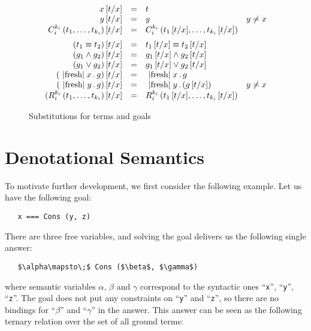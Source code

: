 \begin{figure}[t]
\[
\begin{array}{rcll}
  x\,[t/x] &=& t &\\
  y\,[t/x] &=& y & y\ne x\\
  C_i^{k_i}\,(t_1,\dots,t_{k_i})\,[t/x]&=&C_i^{k_i}\,(t_1\,[t/x],\dots,t_{k_i}\,[t/x])&\\[2mm]
  (t_1 \equiv t_2)\,[t/x]&=&t_1\,[t/x] \equiv t_2\,[t/x]&\\
  (g_1 \wedge g_2)\,[t/x]&=&g_1\,[t/x] \wedge g_2\,[t/x]&\\
  (g_1 \vee g_2)\,[t/x]&=&g_1\,[t/x] \vee g_2\,[t/x]&\\
  (\mbox{\lstinline|fresh|}\;x\,.\,g)\,[t/x]&=&\mbox{\lstinline|fresh|}\;x\,.\,g&\\
  (\mbox{\lstinline|fresh|}\;y\,.\,g)\,[t/x]&=&\mbox{\lstinline|fresh|}\;y\,.\,(g\,[t/x])&y\ne x\\
  (R_i^{k_i}\,(t_1,\dots,t_{k_i})\,[t/x]&=&R_i^{k_i}\,(t_1\,[t/x],\dots,t_{k_i}\,[t/x])&
\end{array}
\]
  \caption{Substitutions for terms and goals}
  \label{substitution}
\end{figure}

\section{Denotational Semantics}
\label{denotational}

To motivate further development, we first consider the following example. Let us have the following goal:

\begin{lstlisting}
   x === Cons (y, z)
\end{lstlisting}

There are three free variables, and solving the goal delivers us the following single answer:

\begin{lstlisting}
   $\alpha\mapsto\;$ Cons ($\beta$, $\gamma$)
\end{lstlisting}

where semantic variables $\alpha$, $\beta$ and $\gamma$ correspond to the syntactic ones ``\lstinline|x|'', ``\lstinline|y|'', ``\lstinline|z|''. The
goal does not put any constraints on ``\lstinline|y|'' and ``\lstinline|z|'', so there are no bindings for ``$\beta$'' and ``$\gamma$'' in the answer.
This answer can be seen as the following ternary relation over the set of all ground terms:

